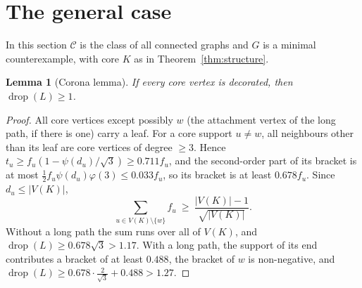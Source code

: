\documentclass[11pt,a4paper]{article}
\newtheorem{lemma}[theorem]{Lemma}
\theoremstyle{definition}
\newcommand{\drop}{\operatorname{drop}}
\newcommand{\C}{\mathcal{C}}
\begin{document}
\section{The general case}\label{sec:general}

In this section $\C$ is the class of all connected graphs and $G$ is a minimal counterexample, with core $K$ as in Theorem~\ref{thm:structure}.

\begin{lemma}[Corona lemma]\label{lem:corona}
If every core vertex is decorated, then $\drop(L)\ge1$.
\end{lemma}
\begin{proof}
All core vertices except possibly $w$ (the attachment vertex of the long path, if there is one) carry a leaf. For a core support $u\ne w$, all neighbours other than its leaf are core vertices of degree $\ge3$. Hence $t_u\ge f_u(1-\psi(d_u)/\sqrt3)\ge0.711f_u$, and the second-order part of its bracket is at most $\frac12f_u\psi(d_u)\varphi(3)\le0.033f_u$, so its bracket is at least $0.678f_u$. Since $d_u\le|V(K)|$,
\[
\sum_{u\in V(K)\setminus\{w\}}f_u\ \ge\ \frac{|V(K)|-1}{\sqrt{|V(K)|}} .
\]
Without a long path the sum runs over all of $V(K)$, and $\drop(L)\ge0.678\sqrt3>1.17$. With a long path, the support of its end contributes a bracket of at least $0.488$, the bracket of $w$ is non-negative, and $\drop(L)\ge0.678\cdot\frac2{\sqrt3}+0.488>1.27$.
\end{proof}
\end{document}
